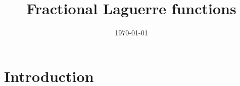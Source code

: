\documentclass[12pt]{article}
\theoremstyle{plain}
\theoremstyle{definition}
\theoremstyle{remark}
\begin{document}
\title{Fractional Laguerre functions}
\author{}
\date{\today}
\maketitle

\section{Introduction}



\end{document}
